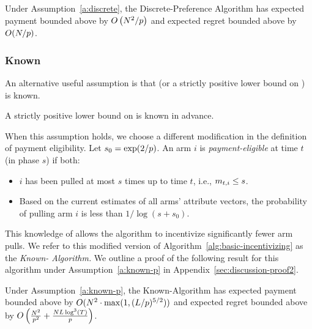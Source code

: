 \begin{theorem}
\label{rst:discrete}
Under Assumption~\ref{a:discrete}, the Discrete-Preference Algorithm
has expected payment bounded above by 
$O \left(N^2/p \right)$
and expected regret bounded above by $O(N / p)$.
\end{theorem}

\subsubsection{Known \MinProb}
An alternative useful assumption is that \MinProb
(or a strictly positive lower bound on \MinProb) is known. 

\begin{assumption}
\label{a:known-p}
A strictly positive lower bound on \MinProb is known in advance.
\end{assumption}

When this assumption holds, we choose a different modification in the
definition of payment eligibility.
Let $s_0 = \exp(2/p)$.
An arm $i$ is \emph{payment-eligible} at time $t$ (in phase $s$)
if both:
\begin{itemize}
\item $i$ has been pulled at most
$s$ times up to time $t$, i.e., $m_{t,i} \leq s$.
\item Based on the current estimates  of all arms' attribute vectors,
the probability of pulling arm $i$ is less than $1/\log(s+s_0)$.
\end{itemize}

This knowledge of \MinProb allows the algorithm to incentivize
significantly fewer arm pulls.
We refer to this modified version of
Algorithm~\ref{alg:basic-incentivizing} as the \emph{Known-\MinProb
Algorithm.}
We outline a proof of the following result for this algorithm under
Assumption~\ref{a:known-p} in Appendix~\ref{sec:discussion-proof2}.

\begin{theorem}
\label{rst:known-p}
Under Assumption~\ref{a:known-p}, the Known-\MinProb Algorithm has
expected payment  bounded above by  
$O(N^2 \cdot \max(1,(L/p)^{5/2}))$ 
and expected regret bounded above by
$O \left( \frac{N^2}{p^2}
  +\frac{N L \log^3(T)}{p}\right)$.
\end{theorem}

